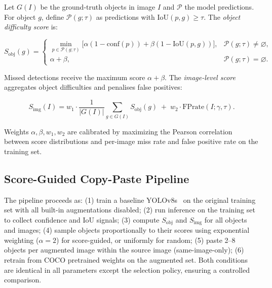 \documentclass[conference]{IEEEtran}
\begin{document}
Let $G(I)$ be the ground-truth objects in image $I$
and $\mathcal{P}$ the model predictions. For object $g$,
define $\mathcal{P}(g;\tau)$ as predictions with
$\mathrm{IoU}(p,g)\ge\tau$. The \textit{object difficulty
score} is:

\begin{equation}
S_{\mathrm{obj}}(g)=
\begin{cases}
\displaystyle\min_{p\in\mathcal{P}(g;\tau)}
\!\bigl[\alpha(1{-}\mathrm{conf}(p))
      +\beta(1{-}\mathrm{IoU}(p,g))\bigr],
& \mathcal{P}(g;\tau)\!\neq\!\varnothing,\\
\alpha+\beta, & \mathcal{P}(g;\tau)=\varnothing.
\end{cases}
\label{eq:obj_score}
\end{equation}

Missed detections receive the maximum score
$\alpha{+}\beta$. The \textit{image-level score}
aggregates object difficulties and penalises false
positives:

\begin{equation}
S_{\mathrm{img}}(I)=
w_1\!\cdot\!\frac{1}{|G(I)|}\!\sum_{g\in G(I)}\!
S_{\mathrm{obj}}(g)
\;+\;w_2\!\cdot\!\mathrm{FPrate}(I;\gamma,\tau).
\label{eq:img_score}
\end{equation}

Weights $\alpha,\beta,w_1,w_2$ are calibrated by
maximizing the Pearson correlation between score
distributions and per-image miss rate and false positive
rate on the training set.

\subsection{Score-Guided Copy-Paste Pipeline}

The pipeline proceeds as: (1) train a baseline
YOLOv8s~\cite{yolov8} on the original training set with
all built-in augmentations disabled; (2) run inference
on the training set to collect confidence and IoU signals;
(3) compute $S_{\mathrm{obj}}$ and $S_{\mathrm{img}}$
for all objects and images; (4) sample objects
proportionally to their scores using exponential weighting
($\alpha{=}2$) for score-guided, or uniformly for random;
(5) paste 2--8 objects per augmented image within the
source image (same-image-only); (6) retrain from COCO
pretrained weights on the augmented set.
Both conditions are identical in all parameters except
the selection policy, ensuring a controlled comparison.

\end{document}

